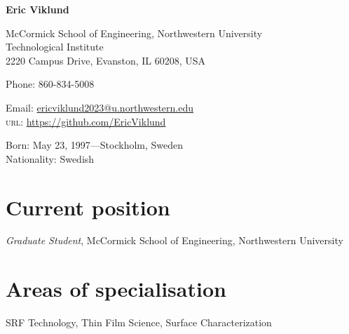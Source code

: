 \documentclass[11pt]{article} %
\begin{document}

{\LARGE\bfseries Eric Viklund} %
\bigskip\bigskip\medskip %

McCormick School of Engineering,  Northwestern University\\ %
Technological Institute\\ 2220 Campus Drive, Evanston, IL 60208, USA
\medskip %

Phone: 860-834-5008 %
\medskip %

Email: \href{mailto:ericviklund2023@u.northwestern.edu}{ericviklund2023@u.northwestern.edu}\\ %
\textsc{url}: \href{https://github.com/EricViklund}{https://github.com/EricViklund}\\ %

\vspace{0.06\textheight} %


Born: May 23, 1997---Stockholm, Sweden\\ %
Nationality: Swedish %


\section*{Current position}

\emph{Graduate Student}, McCormick School of Engineering,  Northwestern University %


\section*{Areas of specialisation}

SRF Technology, Thin Film Science, Surface Characterization %

\end{document}
